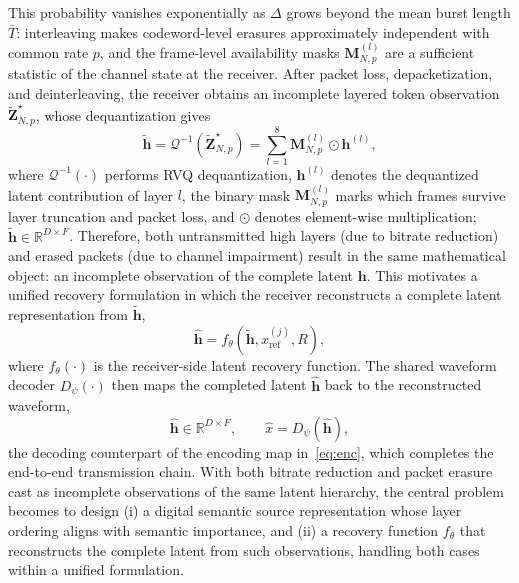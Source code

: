 \documentclass[lettersize,journal]{IEEEtran}
\begin{document}
This probability vanishes exponentially as $\Delta$ grows beyond the mean burst length $\bar{T}$: interleaving makes codeword-level erasures approximately independent with common rate $p$, and the frame-level availability masks $\mathbf{M}^{(l)}_{N,p}$ are a sufficient statistic of the channel state at the receiver. After packet loss, depacketization, and deinterleaving, the receiver obtains an incomplete layered token observation $\tilde{\mathbf{Z}}^{\star}_{N,p}$, whose dequantization gives
\begin{equation}
\widetilde{\mathbf{h}}=\mathcal{Q}^{-1}\!\left(\tilde{\mathbf{Z}}^{\star}_{N,p}\right)=\sum_{l=1}^{8}\mathbf{M}^{(l)}_{N,p}\odot \mathbf{h}^{(l)},
\end{equation}
where $\mathcal{Q}^{-1}(\cdot)$ performs RVQ dequantization, $\mathbf{h}^{(l)}$ denotes the dequantized latent contribution of layer $l$, the binary mask $\mathbf{M}^{(l)}_{N,p}$ marks which frames survive layer truncation and packet loss, and $\odot$ denotes element-wise multiplication; $\widetilde{\mathbf{h}}\in\mathbb{R}^{D\times F}$. Therefore, both untransmitted high layers (due to bitrate reduction) and erased packets (due to channel impairment) result in the same mathematical object: an incomplete observation of the complete latent $\mathbf{h}$. This motivates a unified recovery formulation in which the receiver reconstructs a complete latent representation from $\widetilde{\mathbf{h}}$,
\begin{equation}
\widehat{\mathbf{h}}=f_{\theta}(\widetilde{\mathbf{h}},x_{\mathrm{ref}}^{(j)},R),
\end{equation}
where $f_{\theta}(\cdot)$ is the receiver-side latent recovery function. The shared waveform decoder $D_{\psi}(\cdot)$ then maps the completed latent $\widehat{\mathbf{h}}$ back to the reconstructed waveform,
\begin{equation}
\widehat{\mathbf{h}}\in\mathbb{R}^{D\times F},\qquad \hat{x}=D_{\psi}(\widehat{\mathbf{h}}),
\label{eq:dec}
\end{equation}
the decoding counterpart of the encoding map in~\eqref{eq:enc}, which completes the end-to-end transmission chain. With both bitrate reduction and packet erasure cast as incomplete observations of the same latent hierarchy, the central problem becomes to design (i) a digital semantic source representation whose layer ordering aligns with semantic importance, and (ii) a recovery function $f_{\theta}$ that reconstructs the complete latent from such observations, handling both cases within a unified formulation.
\end{document}
